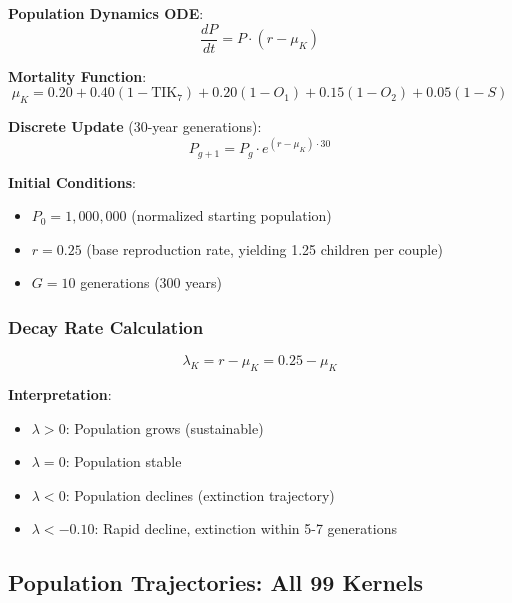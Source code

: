 \documentclass[11pt,a4paper]{article}
\theoremstyle{definition}
\theoremstyle{remark}
\newcommand{\TIKseven}{\text{TIK}_7}
\begin{document}
\textbf{Population Dynamics ODE}:
\begin{equation}
    \frac{dP}{dt} = P \cdot (r - \mu_K)
    \label{eq:pop-ode}
\end{equation}

\textbf{Mortality Function}:
\begin{equation}
    \mu_K = 0.20 + 0.40(1 - \TIKseven) + 0.20(1 - O_1) + 0.15(1 - O_2) + 0.05(1 - S)
    \label{eq:mortality-full}
\end{equation}

\textbf{Discrete Update} (30-year generations):
\begin{equation}
    P_{g+1} = P_g \cdot e^{(r - \mu_K) \cdot 30}
    \label{eq:discrete}
\end{equation}

\textbf{Initial Conditions}:
\begin{itemize}
    \item $P_0 = 1,000,000$ (normalized starting population)
    \item $r = 0.25$ (base reproduction rate, yielding 1.25 children per couple)
    \item $G = 10$ generations (300 years)
\end{itemize}

\subsubsection{Decay Rate Calculation}

\begin{equation}
    \lambda_K = r - \mu_K = 0.25 - \mu_K
    \label{eq:lambda}
\end{equation}

\textbf{Interpretation}:
\begin{itemize}
    \item $\lambda > 0$: Population grows (sustainable)
    \item $\lambda = 0$: Population stable
    \item $\lambda < 0$: Population declines (extinction trajectory)
    \item $\lambda < -0.10$: Rapid decline, extinction within 5-7 generations
\end{itemize}

\subsection{Population Trajectories: All 99 Kernels}
\end{document}
